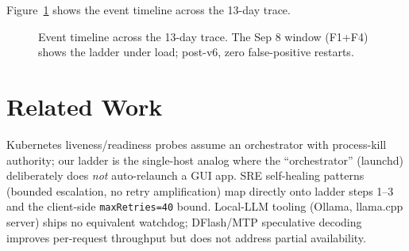 \documentclass[10pt]{article}
\begin{document}
Figure~\ref{fig:timeline} shows the event timeline across the 13-day trace.

\begin{figure}[t]\centering
{}
\caption{Event timeline across the 13-day trace. The Sep 8 window (F1+F4) shows the ladder under load; post-v6, zero false-positive restarts.}
\label{fig:timeline}
\end{figure}

\section{Related Work}\label{sec:related}

Kubernetes liveness/readiness probes assume an orchestrator with process-kill authority; our ladder is the single-host analog where the ``orchestrator'' (launchd) deliberately does \emph{not} auto-relaunch a GUI app. SRE self-healing patterns (bounded escalation, no retry amplification) map directly onto ladder steps 1--3 and the client-side \texttt{maxRetries=40} bound. Local-LLM tooling (Ollama, llama.cpp server) ships no equivalent watchdog; DFlash/MTP speculative decoding improves per-request throughput but does not address partial availability.
\end{document}
